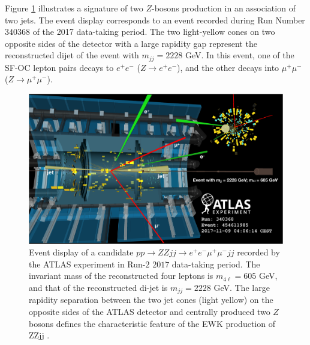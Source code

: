 Figure \ref{fig:EventDisplayZZjj} illustrates a signature of two $Z$-bosons production in an association of two jets. The event display corresponds to an event recorded during Run Number $340368$ of the 2017 data-taking period. The two light-yellow cones on two opposite sides of the detector with a large rapidity gap represent the reconstructed dijet of the event with $m_{jj} = 2228$ GeV. In this event, one of the SF-OC lepton pairs decays to  $e^+e^-$ ($Z\rightarrow e^+e^-$), and the other decays into $\mu^+\mu^-$ ($Z\rightarrow \mu^+\mu^-$).

\begin{figure}
\centering
\includegraphics[width=.9\linewidth]{figures/AnalysisOverview/ZZjjEventDisplay.png}  
\caption{Event display of a candidate $pp \rightarrow ZZjj \rightarrow e^+e^-\mu^+\mu^- jj $ recorded by the ATLAS experiment in Run-$2$ $2017$ data-taking period. The invariant mass of the reconstructed four leptons is $m_{4\ell} = 605$ GeV, and that of the reconstructed di-jet is $m_{jj} = 2228$ GeV. The large rapidity separation between the two jet cones (light yellow) on the opposite sides of the ATLAS detector and centrally produced two $Z$ bosons defines the characteristic feature of the EWK production of ZZjj \label{fig:EventDisplayZZjj} \cite{ATLASZZjj}.}
\end{figure}